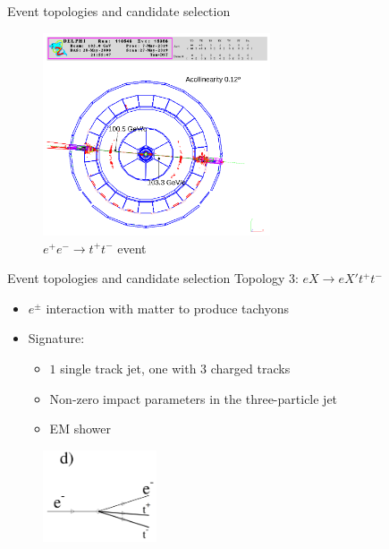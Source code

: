 \documentclass{beamer}
\begin{document}
\begin{frame}{Event topologies and candidate selection}
  \begin{figure}
    \centering
    \includegraphics[width = 0.6\textwidth]{Topology2.png}
    \caption{$e^+e^-\to t^+t^-$ event}
  \end{figure}
\end{frame}

\begin{frame}{Event topologies and candidate selection}
  Topology $3$: $eX\to eX't^+t^-$
  \begin{itemize}
    \item{$e^\pm$ interaction with matter to produce tachyons}
    \item{Signature:}
    \begin{itemize}
      \item{$1$ single track jet, one with $3$ charged tracks}
      \item{Non-zero impact parameters in the three-particle jet}
      \item{EM shower}
    \end{itemize}
  \end{itemize}
  \begin{figure}
    \centering
    \includegraphics[width = 0.3\textwidth]{TopologyD.png}
  \end{figure}%
\end{frame}
\end{document}
